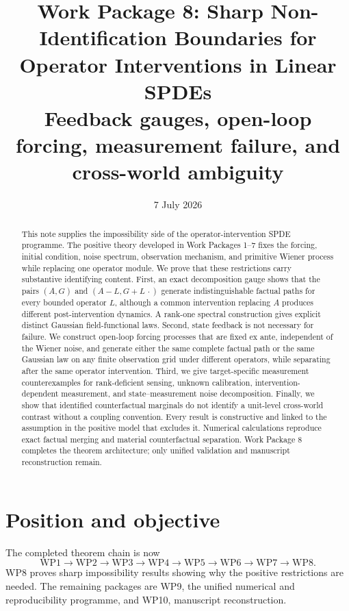 \documentclass[11pt]{article}
\title{Work Package 8: Sharp Non-Identification Boundaries for Operator Interventions in Linear SPDEs\\
\large Feedback gauges, open-loop forcing, measurement failure, and cross-world ambiguity}
\author{}
\date{7 July 2026}
\theoremstyle{remark}
\begin{document}
\maketitle

\begin{abstract}
This note supplies the impossibility side of the operator-intervention SPDE programme. The positive theory developed in Work Packages 1--7 fixes the forcing, initial condition, noise spectrum, observation mechanism, and primitive Wiener process while replacing one operator module. We prove that these restrictions carry substantive identifying content. First, an exact decomposition gauge shows that the pairs $(A,G)$ and $(A-L,G+L\,\cdot)$ generate indistinguishable factual paths for every bounded operator $L$, although a common intervention replacing $A$ produces different post-intervention dynamics. A rank-one spectral construction gives explicit distinct Gaussian field-functional laws. Second, state feedback is not necessary for failure. We construct open-loop forcing processes that are fixed ex ante, independent of the Wiener noise, and generate either the same complete factual path or the same Gaussian law on any finite observation grid under different operators, while separating after the same operator intervention. Third, we give target-specific measurement counterexamples for rank-deficient sensing, unknown calibration, intervention-dependent measurement, and state--measurement noise decomposition. Finally, we show that identified counterfactual marginals do not identify a unit-level cross-world contrast without a coupling convention. Every result is constructive and linked to the assumption in the positive model that excludes it. Numerical calculations reproduce exact factual merging and material counterfactual separation. Work Package 8 completes the theorem architecture; only unified validation and manuscript reconstruction remain.
\end{abstract}

\section{Position and objective}

The completed theorem chain is now
\[
\mathrm{WP1}\to\mathrm{WP2}\to\mathrm{WP3}\to\mathrm{WP4}
\to\mathrm{WP5}\to\mathrm{WP6}\to\mathrm{WP7}\to\mathrm{WP8}.
\]
WP8 proves sharp impossibility results showing why the positive restrictions are needed. The remaining packages are WP9, the unified numerical and reproducibility programme, and WP10, manuscript reconstruction.
\end{document}
